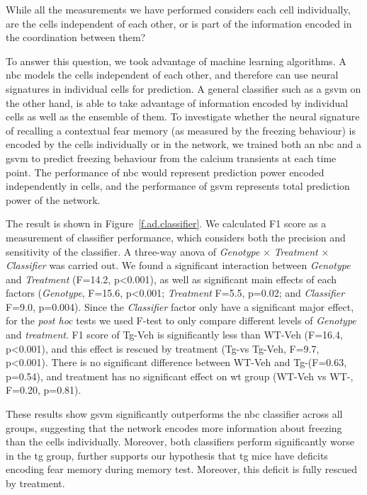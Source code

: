 While all the measurements we have performed considers each cell individually, are the cells independent of each other, or is part of the information encoded in the coordination between them? 

To answer this question, we took advantage of machine learning algorithms. A \gls{nbc} models the cells independent of each other, and therefore can use neural signatures in individual cells for prediction. A general classifier such as a \gls{gsvm} on the other hand, is able to take advantage of information encoded by individual cells as well as the ensemble of them. To investigate whether the neural signature of recalling a contextual fear memory (as measured by the freezing behaviour) is encoded by the cells individually or in the network, we trained both an \gls{nbc} and a \gls{gsvm} to predict freezing behaviour from the calcium transients at each time point. The performance of \gls{nbc} would represent prediction power encoded independently in cells, and the performance of \gls{gsvm} represents total prediction power of the network.

The result is shown in Figure~\ref{f.ad.classifier}. We calculated F1 score as a measurement of classifier performance, which considers both the precision and sensitivity of the classifier. A three-way \gls{anova} of \textit{Genotype} $\times$ \textit{Treatment} $\times$ \textit{Classifier} was carried out. We found a significant interaction between \textit{Genotype} and \textit{Treatment} (F=14.2, p<0.001), as well as significant main effects of each factors (\textit{Genotype}, F=15.6, p<0.001; \textit{Treatment} F=5.5, p=0.02; and \textit{Classifier} F=9.0, p=0.004). Since the \textit{Classifier} factor only have a significant major effect, for the \textit{post hoc} tests we used F-test to only compare different levels of \textit{Genotype} and \textit{treatment}. F1 score of Tg-Veh is significantly less than WT-Veh (F=16.4, p<0.001), and this effect is rescued by \tglu treatment (Tg-\glu vs Tg-Veh, F=9.7, p<0.001). There is no significant difference between WT-Veh and Tg-\glu (F=0.63, p=0.54), and \tglu treatment has no significant effect on \gls{wt} group (WT-Veh vs WT-\glu, F=0.20, p=0.81).  

These results show \gls{gsvm} significantly outperforms the \gls{nbc} classifier across all groups, suggesting that the network encodes more information about freezing than the cells individually. Moreover, both classifiers perform significantly worse in the \gls{tg} group, further supports our hypothesis that \gls{tg} mice have deficits encoding fear memory during memory test. Moreover, this deficit is fully rescued by \tglu treatment. 

